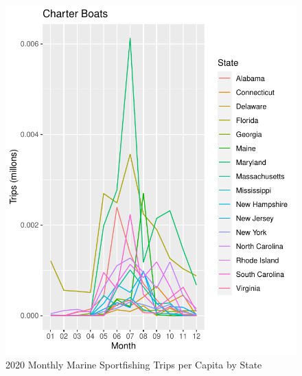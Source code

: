 \documentclass[10pt,letterpaper]{article}
\begin{document}
\begin{figure}

{\centering \includegraphics{C19PolicyRec_files/figure-latex/pTrips-2} 

}

\caption{2020 Monthly Marine Sportfishing Trips per Capita by State}\label{fig:pTrips-2}
\end{figure}
\end{document}

